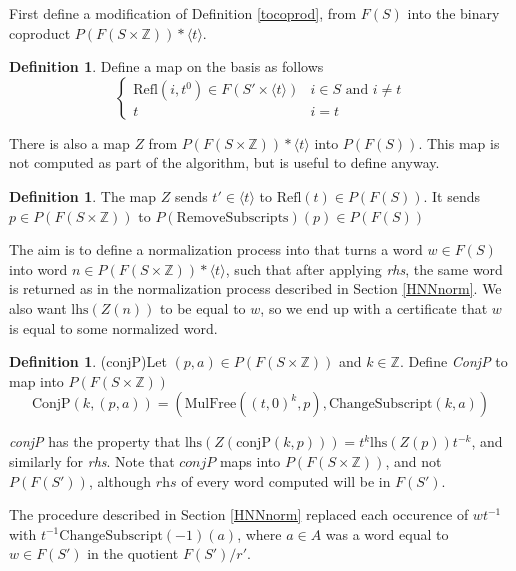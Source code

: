 \documentclass[11pt]{article} %
\theoremstyle{definition}
\theoremstyle{definition}
\theoremstyle{definition}
\theoremstyle{definition}
\theoremstyle{definition}
\newtheorem{defn}[theorem]{Definition}
\theoremstyle{definition}
\begin{document}
First define a modification of Definition \ref{tocoprod}, from $F(S)$ into the binary
coproduct $P(F(S \times \mathbb{Z})) \ast \langle t \rangle$.

\begin{defn}\label{tocoprodP}
  Define a map on the basis as follows
  \begin{equation}
    \begin{cases}
      \text{Refl}(i, t^0) \in F(S' \times \langle t \rangle) & i \in S \text{ and } i \ne t \\
      t & i = t
    \end{cases}
  \end{equation}
\end{defn}

There is also a map $Z$ from $P(F(S \times \mathbb{Z})) \ast \langle t \rangle$ into
$P(F(S))$. This map is not computed as part of the algorithm, but is useful to define anyway.

\begin{defn}
  The map $Z$ sends $t' \in \langle t \rangle$ to $\text{Refl}(t) \in P(F(S))$.
  It sends $p \in P(F(S \times \mathbb{Z}))$ to $P(\text{RemoveSubscripts})(p) \in P(F(S))$
\end{defn}

The aim is to define a normalization process into that turns a word $w \in F(S)$ into
word $n \in P(F(S \times \mathbb{Z})) \ast \langle t \rangle$,
such that after applying \textit{rhs}, the same word is returned as in the
normalization process described in Section \ref{HNNnorm}. We also want
$\text{lhs}(Z(n))$ to be equal to $w$, so we end up with a certificate that $w$
is equal to some normalized word.

\begin{defn}(conjP)\label{conjP}
  Let $(p, a) \in P(F(S \times \mathbb{Z}))$ and $k \in \mathbb{Z}$.
  Define \textit{ConjP} to map into $P(F(S \times \mathbb{Z}))$
  \begin{equation}
    \text{ConjP}(k, (p, a)) = (\text{MulFree}((t,0)^k, p), \text{ChangeSubscript}(k, a))
  \end{equation}
\end{defn}

\textit{conjP} has the property that
$\text{lhs}(Z(\text{conjP}(k, p))) = t^k \text{lhs}(Z(p))t^{-k}$,
and similarly for \textit{rhs}. Note that $\textit{conjP}$ maps into $P(F(S \times \mathbb{Z}))$,
and not $P(F(S'))$, although $\textit{rhs}$ of every word computed
will be in $F(S')$.

The procedure described in Section \ref{HNNnorm}
replaced each occurence of $wt^{-1}$ with \newline $t^{-1}\text{ChangeSubscript}(-1)(a)$,
where $a \in A$ was a word equal to $w \in F(S')$ in the quotient $F(S') / r'$.
\end{document}
